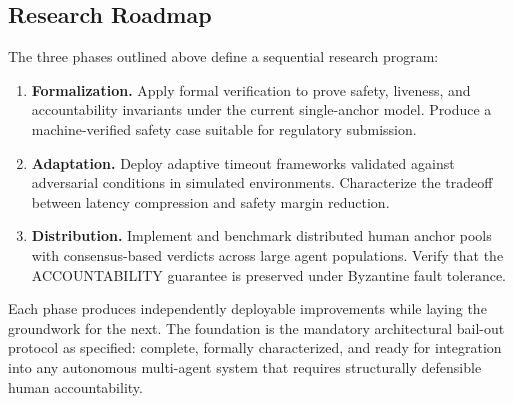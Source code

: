\subsection{Research Roadmap}

The three phases outlined above define a sequential research program:

\begin{enumerate}
\item \textbf{Formalization.} Apply formal verification to prove safety,
  liveness, and accountability invariants under the current single-anchor model.
  Produce a machine-verified safety case suitable for regulatory submission.
\item \textbf{Adaptation.} Deploy adaptive timeout frameworks validated against
  adversarial conditions in simulated environments.  Characterize the tradeoff
  between latency compression and safety margin reduction.
\item \textbf{Distribution.} Implement and benchmark distributed human anchor
  pools with consensus-based verdicts across large agent populations.  Verify that
  the ACCOUNTABILITY guarantee is preserved under Byzantine fault tolerance.
\end{enumerate}

Each phase produces independently deployable improvements while laying the
groundwork for the next.  The foundation is the mandatory architectural
bail-out protocol as specified: complete, formally characterized, and ready for
integration into any autonomous multi-agent system that requires structurally
defensible human accountability.

